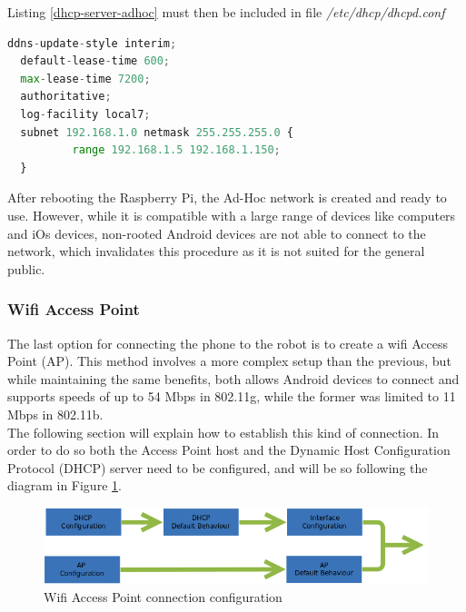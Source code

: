 Listing \ref{dhcp-server-adhoc} must then be included in file \textit{/etc/dhcp/dhcpd.conf} \\

	\begin{minipage}{\linewidth}%
	\begin{lstlisting}[label=dhcp-server-adhoc,caption=DHCP Server Configuration {[} /etc/dhcp/dhcpd.conf {]} ,language=python ]
  ddns-update-style interim;
  default-lease-time 600;
  max-lease-time 7200;
  authoritative;
  log-facility local7;
  subnet 192.168.1.0 netmask 255.255.255.0 {
		  range 192.168.1.5 192.168.1.150;
  }
	\end{lstlisting}
	\end{minipage}

\bigskip	
After rebooting the Raspberry Pi, the Ad-Hoc network is created and ready to use. However, while it is compatible with a large range of devices like computers and iOs devices, non-rooted Android devices are not able to connect to the network, which invalidates this procedure as it is not suited for the general public.












\subsubsection{Wifi Access Point}

The last option for connecting the phone to the robot is to create a wifi Access Point (AP). This method involves a more complex setup than the previous, but while maintaining the same benefits, both allows Android devices to connect and supports speeds of up to 54 Mbps in 802.11g, while the former was limited to 11 Mbps in 802.11b.\\

The following section will explain how to establish this kind of connection. In order to do so both the Access Point host and the Dynamic Host Configuration Protocol (DHCP) server need to be configured, and will be so following the diagram in Figure \ref{apdiagram}.\\

  \begin{figure}[H]
      \centering
      \includegraphics[scale=.6]{images/Diagrams/wifiAP.png}
      \caption{ Wifi Access Point connection configuration }
      \label{apdiagram}
  \end{figure}
  \bigskip


